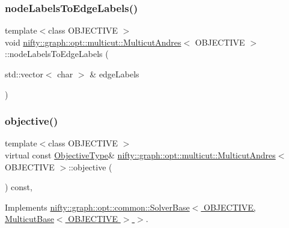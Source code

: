 \subsubsection{\texorpdfstring{node\+Labels\+To\+Edge\+Labels()}{nodeLabelsToEdgeLabels()}}
{\footnotesize\ttfamily template$<$class O\+B\+J\+E\+C\+T\+I\+VE $>$ \\
void \hyperlink{classnifty_1_1graph_1_1opt_1_1multicut_1_1MulticutAndres}{nifty\+::graph\+::opt\+::multicut\+::\+Multicut\+Andres}$<$ O\+B\+J\+E\+C\+T\+I\+VE $>$\+::node\+Labels\+To\+Edge\+Labels (\begin{DoxyParamCaption}\item[{std\+::vector$<$ char $>$ \&}]{edge\+Labels }\end{DoxyParamCaption})\hspace{0.3cm}{\ttfamily [protected]}}

\mbox{\label{classnifty_1_1graph_1_1opt_1_1multicut_1_1MulticutAndres_a957dcf0e0fe86e29d14a154141a1458f}} 
\subsubsection{\texorpdfstring{objective()}{objective()}}
{\footnotesize\ttfamily template$<$class O\+B\+J\+E\+C\+T\+I\+VE $>$ \\
virtual const \hyperlink{classnifty_1_1graph_1_1opt_1_1multicut_1_1MulticutAndres_aed60c2f4ed9c6c6b97e8b513d7a48e86}{Objective\+Type}\& \hyperlink{classnifty_1_1graph_1_1opt_1_1multicut_1_1MulticutAndres}{nifty\+::graph\+::opt\+::multicut\+::\+Multicut\+Andres}$<$ O\+B\+J\+E\+C\+T\+I\+VE $>$\+::objective (\begin{DoxyParamCaption}{ }\end{DoxyParamCaption}) const\hspace{0.3cm}{\ttfamily [inline]}, {\ttfamily [virtual]}}



Implements \hyperlink{classnifty_1_1graph_1_1opt_1_1common_1_1SolverBase_a55e9eb645c07d6e0782ebfb990ab3c84}{nifty\+::graph\+::opt\+::common\+::\+Solver\+Base$<$ O\+B\+J\+E\+C\+T\+I\+V\+E, Multicut\+Base$<$ O\+B\+J\+E\+C\+T\+I\+V\+E $>$ $>$}.



